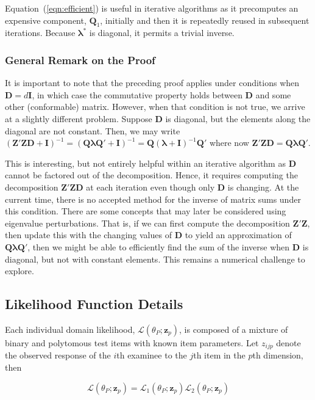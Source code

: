 \documentclass[12pt]{article}
\begin{document}
Equation~(\ref{eqn:efficient}) is useful in iterative algorithms as it precomputes an expensive component, $\bm{Q}_1$, initially and then it is repeatedly reused in subsequent iterations. Because $\bm{\lambda}^*$ is diagonal, it permits a trivial inverse. 

\subsubsection*{General Remark on the Proof}
It is important to note that the preceding proof applies under conditions when $\bm{D}=d\bm{I}$, in which case the commutative property holds between $\bm{D}$ and some other (conformable) matrix. However, when that condition is not true, we arrive at a slightly different problem. Suppose $\bm{D}$ is diagonal, but the elements along the diagonal are not constant. Then, we may write $(\bm{Z}'\bm{Z}\bm{D} + \bm{I})^{-1} = (\bm{Q} \bm{\lambda} \bm{Q}' + \bm{I})^{-1} = \bm{Q} (\bm{\lambda}+\bm{I})^{-1} \bm{Q}'$ where now $\bm{Z}'\bm{Z}\bm{D} = \bm{Q} \bm{\lambda} \bm{Q}'$.

This is interesting, but not entirely helpful within an iterative algorithm as $\bm{D}$ cannot be factored out of the decomposition. Hence, it requires computing the decomposition $\bm{Z}'\bm{Z}\bm{D}$ at each iteration even though only $\bm{D}$ is changing. At the current time, there is no accepted method for the inverse of matrix sums under this condition. There are some concepts that may later be considered using eigenvalue perturbations. That is, if we can first compute the decomposition $\bm{Z}'\bm{Z}$, then update this with the changing values of $\bm{D}$ to yield an approximation of $\bm{Q} \bm{\lambda} \bm{Q}'$, then we might be able to efficiently find the sum of the inverse when $\bm{D}$ is diagonal, but not with constant elements. This remains a numerical challenge to explore.

\subsection*{Likelihood Function Details}

Each individual domain likelihood, $\mathcal{L}(\theta_P;\bm{z}_p)$, is composed of a mixture of binary and polytomous test items with known item parameters. Let $z_{ijp}$ denote the observed response of the $i$th examinee to the $j$th item in the $p$th dimension, then

\begin{equation}
\mathcal{L}(\theta_P;\bm{z}_p) = \mathcal{L}_1(\theta_P;\bm{z}_p)\mathcal{L}_2(\theta_P;\bm{z}_p)\nonumber
\end{equation}
\end{document}
